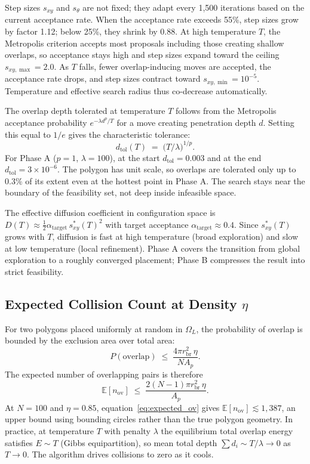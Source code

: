 \documentclass[10pt,twocolumn]{article}
\begin{document}
Step sizes $s_{xy}$ and $s_\theta$ are not fixed; they adapt every
1{,}500 iterations based on the current acceptance rate. When the
acceptance rate exceeds 55\%, step sizes grow by factor 1.12; below
25\%, they shrink by 0.88. At high temperature $T$, the Metropolis
criterion accepts most proposals including those creating shallow
overlaps, so acceptance stays high and step sizes expand toward the
ceiling $s_{xy,\max} = 2.0$. As $T$ falls, fewer overlap-inducing moves
are accepted, the acceptance rate drops, and step sizes contract toward
$s_{xy,\min} = 10^{-5}$. Temperature and effective search radius thus
co-decrease automatically.

The overlap depth tolerated at temperature $T$ follows from the
Metropolis acceptance probability $e^{-\lambda d^p/T}$ for a move
creating penetration depth $d$. Setting this equal to $1/e$ gives the
characteristic tolerance:
\begin{equation}
  d_{\mathrm{tol}}(T) \;=\; \bigl(T/\lambda\bigr)^{1/p}.
  \label{eq:dtol}
\end{equation}
For Phase A ($p=1$, $\lambda=100$), at the start $d_{\mathrm{tol}} =
0.003$ and at the end $d_{\mathrm{tol}} = 3\times 10^{-6}$. The
polygon has unit scale, so overlaps are tolerated only up to 0.3\% of
its extent even at the hottest point in Phase A. The search stays near
the boundary of the feasibility set, not deep inside infeasible space.

The effective diffusion coefficient in configuration space is
$D(T) \approx \tfrac{1}{2}\alpha_{\mathrm{target}}\,s_{xy}^*(T)^2$
with target acceptance $\alpha_{\mathrm{target}} \approx 0.4$.
Since $s_{xy}^*(T)$ grows with $T$, diffusion is fast at high
temperature (broad exploration) and slow at low temperature (local
refinement). Phase A covers the transition from global exploration to a
roughly converged placement; Phase B compresses the result into strict
feasibility.

\subsection{Expected Collision Count at Density $\eta$}
\label{sec:expected_collisions}

For two polygons placed uniformly at random in $\Omega_L$, the
probability of overlap is bounded by the exclusion area over total area:
\[
  P(\text{overlap})
  \;\leq\; \frac{4\pi r_{\mathrm{br}}^2\,\eta}{N A_p}.
\]
The expected number of overlapping pairs is therefore
\begin{equation}
  \mathbb{E}[n_{\mathrm{ov}}]
  \;\leq\; \frac{2(N-1)\pi r_{\mathrm{br}}^2\,\eta}{A_p}.
  \label{eq:expected_ov}
\end{equation}
At $N=100$ and $\eta=0.85$, equation~\eqref{eq:expected_ov} gives
$\mathbb{E}[n_{\mathrm{ov}}] \lesssim 1{,}387$, an upper bound using
bounding circles rather than the true polygon geometry. In practice, at
temperature $T$ with penalty $\lambda$ the equilibrium total overlap
energy satisfies $E \sim T$ (Gibbs equipartition), so mean total depth
$\sum d_i \sim T/\lambda \to 0$ as $T \to 0$. The algorithm drives
collisions to zero as it cools.
\end{document}
